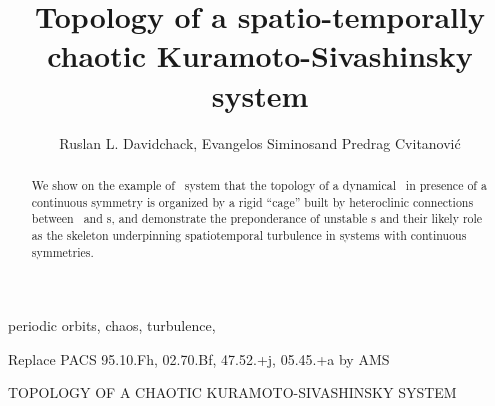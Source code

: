 \documentclass{siamltex}
\begin{document}
                \title{
Topology of a spatio-temporally chaotic Kuramoto-Sivashinsky system
                 }
                  \author{
Ruslan L. Davidchack\footnotemark[1],
Evangelos Siminos\footnotemark[2]
    and
Predrag Cvitanovi\'c\footnotemark[2]
                    }
                  

                \maketitle

\renewcommand{\thefootnote}{\fnsymbol{footnote}}
\renewcommand{\thefootnote}{\arabic{footnote}}
  
                \begin{abstract}
We show on the example of \KS\ system
that the topology of a dynamical \statesp\ in presence of 
a continuous symmetry is organized by 
a rigid ``cage'' built by heteroclinic connections
between \eqva\ and \rpo s, and demonstrate the
preponderance of unstable \rpo s and their likely
role as the skeleton underpinning spatiotemporal turbulence in
systems with continuous symmetries.  
                \end{abstract}

\begin{keywords}
periodic orbits, chaos, turbulence, {\KSe}
\end{keywords}

\begin{AMS}
    Replace PACS 95.10.Fh, 02.70.Bf, 47.52.+j, 05.45.+a by AMS
\end{AMS}

\pagestyle{myheadings}
\thispagestyle{plain}
         {TOPOLOGY OF A CHAOTIC KURAMOTO-SIVASHINSKY SYSTEM}









    \PublicPrivate{%
        }{%
\appendix

\newpage
    } %
\end{document}
